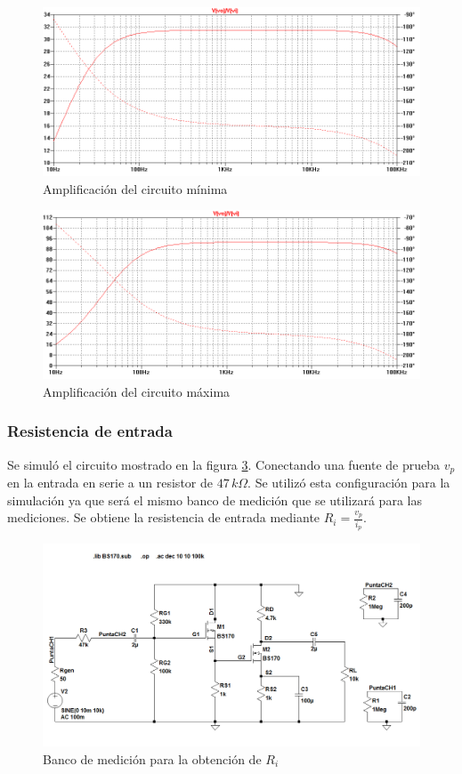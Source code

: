 \documentclass[10pt,spanish,a4paper,notitlepage]{article}
\begin{document}
\begin{figure}[H]
\centering
\includegraphics[scale=0.5]{simulaciones/B_av_min.png}
\caption{Amplificación del circuito mínima}
\label{fig:AyB_av_min}
\end{figure}

\begin{figure}[H]
\centering
\includegraphics[scale=0.5]{simulaciones/B_av_max.png}
\caption{Amplificación del circuito máxima}
\label{fig:AyB_av_max}
\end{figure}


\subsubsection{Resistencia de entrada}

Se simuló el circuito mostrado en la figura \ref{fig:B_banco_Ri}.
Conectando una fuente de prueba $v_p$ en la entrada en serie a un
resistor de $47\,\unit{k\Omega}$. Se utilizó esta configuración
para la simulación ya que será el mismo banco de medición que
se utilizará para las mediciones.
Se obtiene la resistencia de entrada mediante $R_i = \frac{v_p}{i_p}$.

\begin{figure}[H]
\centering
\includegraphics[scale=0.45]{circuitos/B_banco_Ri.png}
\caption{Banco de medición para la obtención de $R_i$}
\label{fig:B_banco_Ri}
\end{figure}
\end{document}
